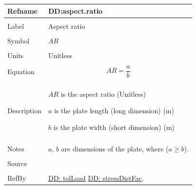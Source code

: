 \documentclass[12pt]{article}
\begin{document}
\noindent \begin{minipage}{\textwidth}
\begin{tabular}{p{} p{}}
\toprule \textbf{Refname} & \textbf{DD:aspect.ratio}
\label{DD:aspect.ratio}
\\ \midrule \\
Label & Aspect ratio
\\ \midrule \\
Symbol & $AR$
\\ \midrule \\
Units & Unitless
\\ \midrule \\
Equation & \begin{displaymath}
           AR=\frac{a}{b}
           \end{displaymath}
\\ \midrule \\
Description & \begin{symbDescription}
              \item{$AR$ is the aspect ratio (Unitless)}
              \item{$a$ is the plate length (long dimension) (m)}
              \item{$b$ is the plate width (short dimension) (m)}
              \end{symbDescription}
\\ \midrule \\
Notes & $a$, $b$ are dimensions of the plate, where ($a\geq{}b$).
\\ \midrule \\
Source & \cite{astm2009}
\\ \midrule \\
RefBy & \hyperref[DD:tolLoad]{DD: tolLoad} \hyperref[DD:stressDistFac]{DD: stressDistFac}.
\\ \bottomrule \end{tabular}
\end{minipage}
\par~
\end{document}
